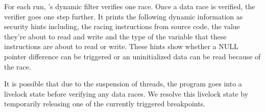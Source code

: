 

For each run, \xxx's dynamic filter verifies one race. Once a data race is 
verified, the verifier goes one step further. It prints the following dynamic
information as security hints including, the racing instructions from source
code, the value they're about to read and write and the type of the variable
that these instructions are about to read or write. These hints show whether a 
NULL pointer difference can be triggered or an uninitialized data can be read 
because of the race.

It is possible that due to the suspension of threads, the program goes into a 
livelock state before verifying any data races. We resolve this livelock state
by temporarily releasing one of the currently triggered breakpoints. 




